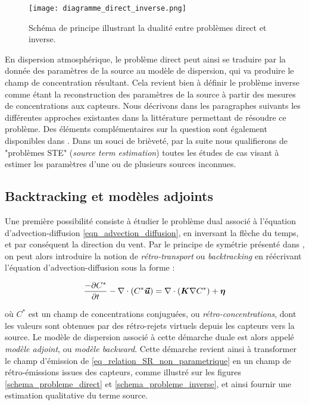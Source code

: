 	\begin{figure}
		\centering
		\texttt{[image: diagramme\_direct\_inverse.png]}
		\caption{Schéma de principe illustrant la dualité entre problèmes direct et inverse.}
		\label{fig_diagramme_direct_inverse}
	\end{figure}
	
	
	En dispersion atmosphérique, le problème direct peut ainsi se traduire par la donnée des paramètres de la source au modèle de dispersion, qui va produire le champ de concentration résultant. Cela revient bien à définir le problème inverse comme étant la reconstruction des paramètres de la source à partir des mesures de concentrations aux capteurs. Nous décrivons dans les paragraphes suivants les différentes approches existantes dans la littérature permettant de résoudre ce problème. Des éléments complémentaires sur la question sont également disponibles dans \cite{Rao2007}. Dans un souci de brièveté, par la suite nous qualifierons de "problèmes STE" (\textit{source term estimation}) toutes les études de cas visant à estimer les paramètres d'une ou de plusieurs sources inconnues.\\
	
	
 \subsection{Backtracking et modèles adjoints}
 
 Une première possibilité consiste à étudier le problème dual associé à l'équation d'advection-diffusion  \eqref{eqn_advection_diffusion}, en inversant la flèche du temps, et par conséquent la direction du vent.  Par le principe de symétrie présenté dans \cite{Hourdin2006a}, on peut alors introduire la notion de \textit{rétro-transport} ou \textit{backtracking} en  réécrivant l'équation d'advection-diffusion sous la forme : 
 
 \begin{equation}
 \label{eqn_advection_diffusion_backward}
 \dfrac{-\partial C^*}{\partial t} - \nabla \cdot(C^*\bm{\vec{u}}) = \nabla \cdot (\bm{K}\nabla C^*) + {\bm{\eta}}
 \end{equation}
 
 où $C^*$ est un champ de concentrations conjuguées, ou \textit{rétro-concentrations}, dont les valeurs sont obtenues par des rétro-rejets virtuels depuis les capteurs vers la source. Le modèle de dispersion associé à cette démarche duale est alors appelé \textit{modèle adjoint}, ou \textit{modèle backward}. Cette démarche revient ainsi à transformer le champ d'émission de \eqref{eq_relation_SR_non_parametrique} en un champ de rétro-émissions issues des capteurs, comme illustré sur les figures \ref{schema_probleme_direct} et \ref{schema_probleme_inverse}, et ainsi fournir une estimation qualitative du terme source.\\
 
